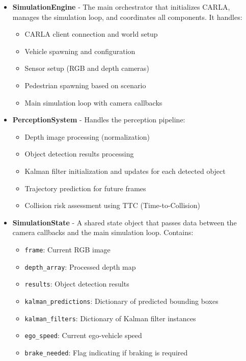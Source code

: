 \begin{itemize}
    \item \textbf{SimulationEngine} - The main orchestrator that initializes CARLA, manages the simulation loop, and coordinates all components. It handles:
    \begin{itemize}
        \item CARLA client connection and world setup
        \item Vehicle spawning and configuration
        \item Sensor setup (RGB and depth cameras)
        \item Pedestrian spawning based on scenario
        \item Main simulation loop with camera callbacks
    \end{itemize}

    \item \textbf{PerceptionSystem} - Handles the perception pipeline:
    \begin{itemize}
        \item Depth image processing (normalization)
        \item Object detection results processing
        \item Kalman filter initialization and updates for each detected object
        \item Trajectory prediction for future frames
        \item Collision risk assessment using TTC (Time-to-Collision)
    \end{itemize}

    \item \textbf{SimulationState} - A shared state object that passes data between the camera callbacks and the main simulation loop. Contains:
    \begin{itemize}
        \item \texttt{frame}: Current RGB image
        \item \texttt{depth\_array}: Processed depth map
        \item \texttt{results}: Object detection results
        \item \texttt{kalman\_predictions}: Dictionary of predicted bounding boxes
        \item \texttt{kalman\_filters}: Dictionary of Kalman filter instances
        \item \texttt{ego\_speed}: Current ego-vehicle speed
        \item \texttt{brake\_needed}: Flag indicating if braking is required
    \end{itemize}


\end{itemize}
